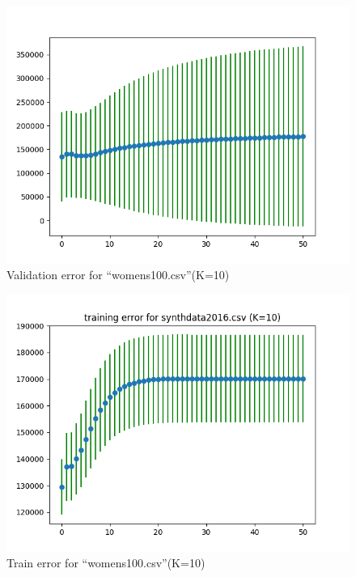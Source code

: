 \documentclass[12pt]{amsart}
\begin{document}
$ $\\
\begin{figure}
    \centering
    \includegraphics[scale=0.7]{K=10_synth.png}
    \caption{Validation error for ``womens100.csv''(K=10)}
    \label{fig:my_label}
\end{figure}
\begin{figure}
    \centering
    \includegraphics[scale=0.7]{K=10_synth_t.png}
    \caption{Train error for ``womens100.csv''(K=10)}
    \label{fig:my_label}
\end{figure}
\end{document}
